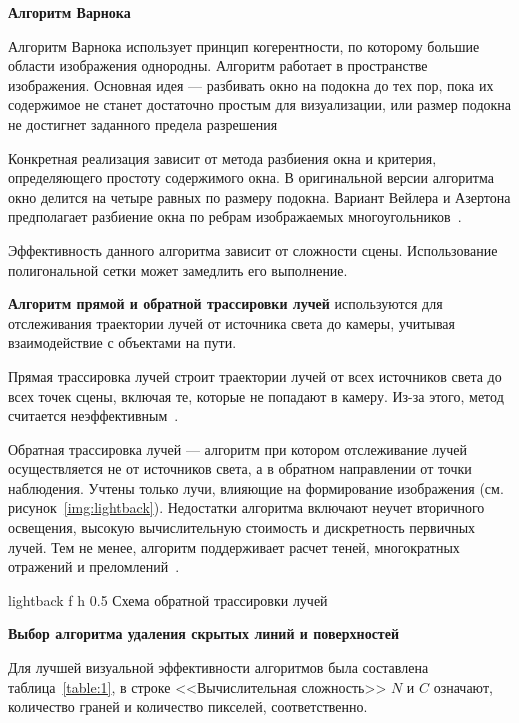 \fi

\textbf{Алгоритм Варнока}

Алгоритм Варнока использует принцип когерентности, по которому большие области изображения однородны.
Алгоритм работает в пространстве изображения.
Основная идея --- разбивать окно на подокна до тех пор, пока их содержимое не станет достаточно простым для визуализации, или размер подокна не достигнет заданного предела разрешения~\cite{del_line, varnok}

Конкретная реализация зависит от метода разбиения окна и критерия, определяющего простоту содержимого окна.
В оригинальной версии алгоритма окно делится на четыре равных по размеру подокна.
Вариант Вейлера и Азертона предполагает разбиение окна по ребрам изображаемых многоугольников~\cite{varnok}.


Эффективность данного алгоритма зависит от сложности сцены. Использование полигональной сетки может замедлить его выполнение.


\textbf{Алгоритм прямой и обратной трассировки лучей} используются для отслеживания траектории лучей от источника света до камеры, учитывая взаимодействие с объектами на пути. 

Прямая трассировка лучей строит траектории лучей от всех источников света до всех точек сцены, включая те, которые не попадают в камеру. Из-за этого, метод считается неэффективным~\cite{ray_tracing}.

Обратная трассировка лучей --- алгоритм при котором отслеживание лучей осуществляется не от источников света, а в обратном направлении от точки наблюдения. 
Учтены только лучи, влияющие на формирование изображения (см. рисунок~\ref{img:lightback}).
Недостатки алгоритма включают неучет вторичного освещения, высокую вычислительную стоимость и дискретность первичных лучей.
Тем не менее, алгоритм поддерживает расчет теней, многократных отражений и преломлений~\cite{ray_tracing}.

	{lightback} %
	{f} %
	{h} %
	{0.5\textwidth} %
	{Схема обратной трассировки лучей} %

\textbf{Выбор алгоритма удаления скрытых линий и поверхностей}

Для лучшей визуальной эффективности алгоритмов была составлена таблица~\ref{table:1}, в строке <<Вычислительная сложность>> $N$ и $C$ означают, количество граней и количество пикселей, соответственно.

